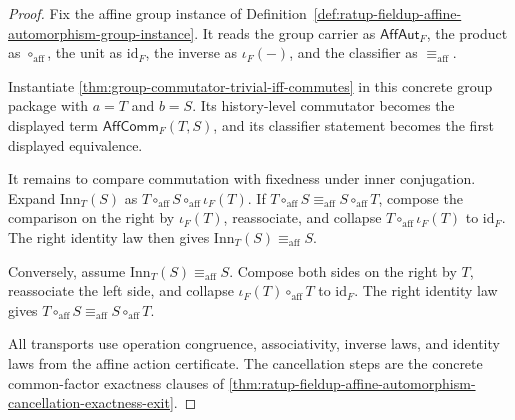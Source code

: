 \begin{proof}
Fix the affine group instance of
Definition~\ref{def:ratup-fieldup-affine-automorphism-group-instance}. It
reads the group carrier as $\mathsf{AffAut}_F$, the product as
$\circ_{\mathrm{aff}}$, the unit as $\mathrm{id}_F$, the inverse as
$\iota_F(-)$, and the classifier as $\equiv_{\mathrm{aff}}$.

Instantiate \autoref{thm:group-commutator-trivial-iff-commutes} in this
concrete group package with $a=T$ and $b=S$. Its history-level commutator
becomes the displayed term $\mathsf{AffComm}_F(T,S)$, and its classifier
statement becomes the first displayed equivalence.

It remains to compare commutation with fixedness under inner conjugation.
Expand $\mathrm{Inn}_T(S)$ as
$T\circ_{\mathrm{aff}}S\circ_{\mathrm{aff}}\iota_F(T)$. If
$T\circ_{\mathrm{aff}}S\equiv_{\mathrm{aff}}S\circ_{\mathrm{aff}}T$, compose
the comparison on the right by $\iota_F(T)$, reassociate, and collapse
$T\circ_{\mathrm{aff}}\iota_F(T)$ to $\mathrm{id}_F$. The right identity law
then gives $\mathrm{Inn}_T(S)\equiv_{\mathrm{aff}}S$.

Conversely, assume
$\mathrm{Inn}_T(S)\equiv_{\mathrm{aff}}S$. Compose both sides on the right by
$T$, reassociate the left side, and collapse
$\iota_F(T)\circ_{\mathrm{aff}}T$ to $\mathrm{id}_F$. The right identity law
gives $T\circ_{\mathrm{aff}}S\equiv_{\mathrm{aff}}S\circ_{\mathrm{aff}}T$.

All transports use operation congruence, associativity, inverse laws, and
identity laws from the affine action certificate. The cancellation steps are
the concrete common-factor exactness clauses of
\autoref{thm:ratup-fieldup-affine-automorphism-cancellation-exactness-exit}.
\end{proof}

